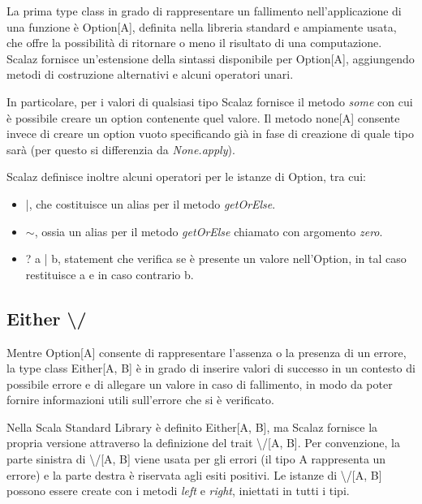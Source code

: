 La prima type class in grado di rappresentare un fallimento nell'applicazione di una funzione è Option[A], definita nella libreria standard e ampiamente usata, che offre la possibilità di ritornare o meno il risultato di una computazione. Scalaz fornisce un'estensione della sintassi disponibile per Option[A], aggiungendo metodi di costruzione alternativi e alcuni operatori unari.

In particolare, per i valori di qualsiasi tipo Scalaz fornisce il metodo \textit{some} con cui è possibile creare un option contenente quel valore. Il metodo none[A] consente invece di creare un option vuoto specificando già in fase di creazione di quale tipo sarà (per questo si differenzia da \textit{None.apply}).



Scalaz definisce inoltre alcuni operatori per le istanze di Option, tra cui:

\begin{itemize}
\item |, che costituisce un alias per il metodo \textit{getOrElse}.
\item $\sim$, ossia un alias per il metodo \textit{getOrElse} chiamato con argomento \textit{zero}.
\item ? a | b, statement che verifica se è presente un valore nell'Option, in tal caso restituisce a e in caso contrario b.
\end{itemize}

\subsection{Either \textbackslash/}

Mentre Option[A] consente di rappresentare l'assenza o la presenza di un errore, la type class Either[A, B] è in grado di inserire valori di successo in un contesto di possibile errore e di allegare un valore in caso di fallimento, in modo da poter fornire informazioni utili sull'errore che si è verificato.

Nella Scala Standard Library è definito Either[A, B], ma Scalaz fornisce la propria versione attraverso la definizione del trait \textbackslash/[A, B]. Per convenzione, la parte sinistra di \textbackslash/[A, B] viene usata per gli errori (il tipo A rappresenta un errore) e la parte destra è riservata agli esiti positivi. Le istanze di \textbackslash/[A, B] possono essere create con i metodi \textit{left} e \textit{right}, iniettati in tutti i tipi.

